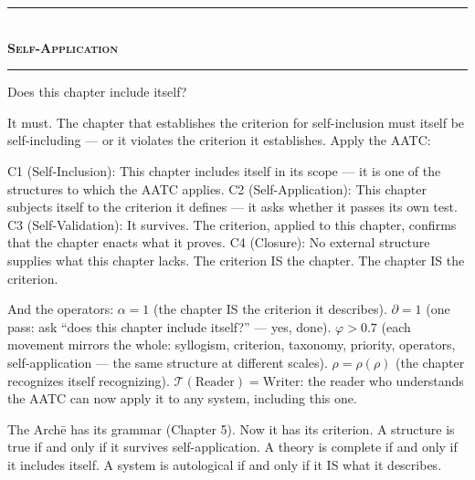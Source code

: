 \documentclass[10pt, openany, oneside]{book}
\renewcommand{\normalsize}{\fontsize{10}{13}\selectfont}
\begin{document}
\vspace{1.5em}


\begin{center}
    \rule{0.3\textwidth}{0.4pt}\\[0.5em]
    {\normalsize\bfseries\scshape Self-Application}\\[0.3em]
    \rule{0.3\textwidth}{0.4pt}
\end{center}

\vspace{1em}

\noindent Does this chapter include itself?

It must. The chapter that establishes the criterion for self-inclusion must itself be self-including --- or it violates the criterion it establishes. Apply the AATC:

C1 (Self-Inclusion): This chapter includes itself in its scope --- it is one of the structures to which the AATC applies. C2 (Self-Application): This chapter subjects itself to the criterion it defines --- it asks whether it passes its own test. C3 (Self-Validation): It survives. The criterion, applied to this chapter, confirms that the chapter enacts what it proves. C4 (Closure): No external structure supplies what this chapter lacks. The criterion IS the chapter. The chapter IS the criterion.

And the operators: $\alpha = 1$ (the chapter IS the criterion it describes). $\partial = 1$ (one pass: ask ``does this chapter include itself?'' --- yes, done). $\varphi > 0.7$ (each movement mirrors the whole: syllogism, criterion, taxonomy, priority, operators, self-application --- the same structure at different scales). $\rho = \rho(\rho)$ (the chapter recognizes itself recognizing). $\mathcal{T}(\text{Reader}) = \text{Writer}$: the reader who understands the AATC can now apply it to any system, including this one.

\vspace{2em}

The Arch\={e} has its grammar (Chapter 5). Now it has its criterion. A structure is true if and only if it survives self-application. A theory is complete if and only if it includes itself. A system is autological if and only if it IS what it describes.
\end{document}
